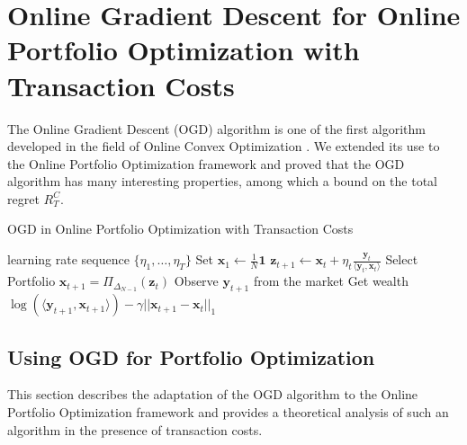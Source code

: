 \chapter{Online Gradient Descent for Online Portfolio Optimization with Transaction Costs}\label{ch:OGD}

The Online Gradient Descent (OGD) algorithm is one of the first algorithm developed in the field of Online Convex Optimization \cite{zinkevich2003online}. We extended its use to the Online Portfolio Optimization framework and proved that the OGD algorithm has many interesting properties, among which a bound on the total regret $R_T^C$.

\begin{algorithm}
    \caption{OGD in Online Portfolio Optimization with Transaction Costs}
    \label{alg:OGD_in_OPO}
    \begin{algorithmic}[1]
    \REQUIRE learning rate sequence $\{\eta_1, \ldots, \eta_T\}$  \nonumber
    \STATE Set $\mathbf{x}_1 \gets \frac{1}{N} \mathbf{1}$ \label{line:init_OGD}
    \STATE $\mathbf{z}_{t+1} \gets \mathbf{x}_{t}+ \eta_t \frac{\mathbf{y}_t}{\langle \mathbf{y}_t,\mathbf{x}_t \rangle}$ \label{line:update_OGD}
    \STATE Select Portfolio $\mathbf x_{t+1}=\Pi_{\Delta_{N-1}}(\mathbf z_t)$ \label{line:line_projection_OGD}
    \STATE Observe $\mathbf{y}_{t+1}$ from the market \label{line:out_OGD}
    \STATE Get wealth $\log( \langle \mathbf{y}_{t+1},\mathbf{x}_{t+1} \rangle) - \gamma|| \mathbf{x}_{t+1} - \mathbf{x}_{t} ||_1$ \label{line:wealth}
    \ENDFOR
    \end{algorithmic}
\end{algorithm}

\section{Using OGD for Portfolio Optimization} \label{sec:analysis}

This section describes the adaptation of the OGD algorithm to the Online Portfolio Optimization framework and provides a theoretical analysis of such an algorithm in the presence of transaction costs.

